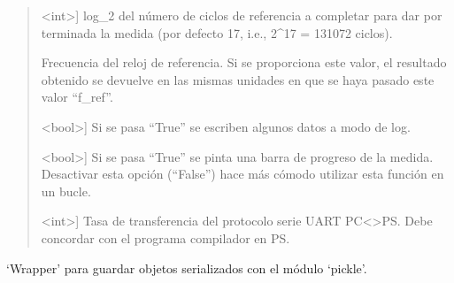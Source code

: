 \documentclass[letterpaper,10pt,english]{sphinxmanual}
\begin{document}
\begin{fulllineitems}
\begin{fulllineitems}
\begin{quote}
\begin{description}
\sphinxlineitem{resol}{[}\textless{}int\textgreater{}{]}
\sphinxAtStartPar
log\_2 del número de ciclos de referencia a completar para dar 
por terminada la medida (por defecto 17, i.e., 2\textasciicircum{}17 = 131072 
ciclos).

\sphinxAtStartPar
Frecuencia del reloj de referencia. Si se proporciona este 
valor, el resultado obtenido se devuelve en las mismas unidades
en que se haya pasado este valor “f\_ref”.

\sphinxlineitem{log}{[}\textless{}bool\textgreater{}{]}
\sphinxAtStartPar
Si se pasa “True” se escriben algunos datos a modo de log.

\sphinxlineitem{verbose}{[}\textless{}bool\textgreater{}{]}
\sphinxAtStartPar
Si se pasa “True” se pinta una barra de progreso de la medida. 
Desactivar esta opción (“False”) hace más cómodo utilizar esta 
función en un bucle.

\sphinxlineitem{baudrate}{[}\textless{}int\textgreater{}{]}
\sphinxAtStartPar
Tasa de transferencia del protocolo serie UART PC\textless{}\textendash{}\textgreater{}PS. Debe 
concordar con el programa compilador en PS.

\end{description}
\end{quote}

\end{fulllineitems}


\begin{fulllineitems}
\label{\detokenize{myfpga:myfpga.ring_osc.StdMatrix.save}}
\pysigstartsignatures
{}
\pysigstopsignatures
\sphinxAtStartPar
‘Wrapper’ para guardar objetos serializados con el módulo ‘pickle’.

\end{fulllineitems}


\end{fulllineitems}

\end{document}
